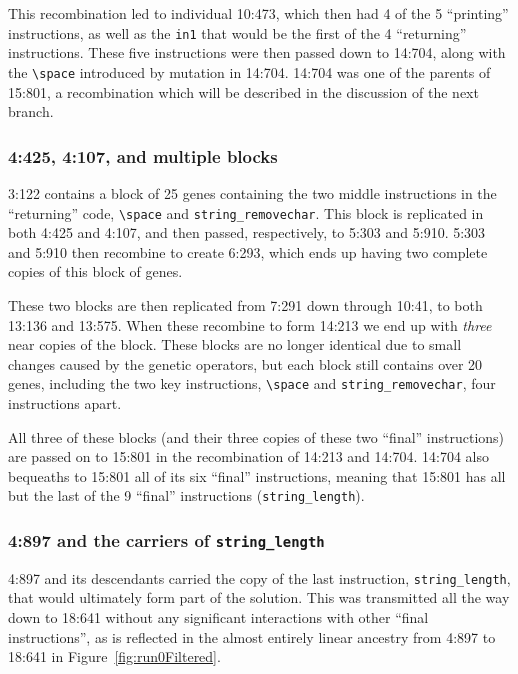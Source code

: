 This recombination
led to individual 10:473, which then had 4 of the 5 ``printing'' instructions,
as well as the \texttt{in1} that would be the first of the 4 ``returning''
instructions. These five instructions were then passed down to 14:704, 
along with the 
\texttt{\textbackslash space} introduced by mutation in 14:704. 14:704 was
one of the parents of 15:801, a recombination which will be described in the
discussion of the next branch.

\subsubsection{4:425, 4:107, and multiple blocks}
\label{sec:4:425}

3:122 contains a block of 25 genes %
containing the two middle instructions in the ``returning''
code, \texttt{\textbackslash space} and \texttt{string\_removechar}.
This block is replicated in both 4:425 and 4:107, and then passed,
respectively, to 5:303 and 5:910. 5:303 and 5:910 then recombine
to create 6:293, which ends up having two complete copies of this
block of genes. %

These two blocks are then replicated from 7:291 down through 10:41,
to both 13:136 and 13:575. When these recombine to form 14:213
we end up with \emph{three} near copies of the block. These blocks
are no longer identical due to small changes caused by the
genetic operators, but each block still contains over 20 genes,
including the two key instructions,
\texttt{\textbackslash space} and \texttt{string\_removechar},
four instructions apart.

All three of these blocks (and their three copies of these two ``final''
instructions) are passed on to 15:801 in the recombination of 14:213 and
14:704. 14:704 also bequeaths to 15:801 all of its six ``final'' 
instructions, meaning that 15:801 has all but the last of the 9 ``final''
instructions (\texttt{string\_length}).

\subsubsection{4:897 and the carriers of \texttt{string\_length}}
\label{sec:4:897}

4:897 and its descendants carried the copy of the last instruction, 
\texttt{string\_length}, that would ultimately form part of the solution. 
This was transmitted all the way down to
18:641 without any significant interactions with other ``final instructions'',
as is reflected in the almost entirely linear ancestry from 4:897 to 18:641 
in Figure~\ref{fig:run0Filtered}.


